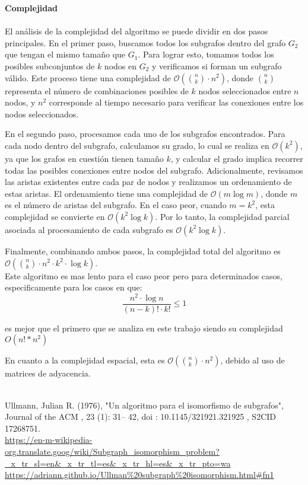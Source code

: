 \documentclass[12pt,a4paper]{article}
\begin{document}
\textbf{Complejidad}\\
\\
El análisis de la complejidad del algoritmo se puede dividir en dos pasos principales. En el primer paso, buscamos todos los subgrafos dentro del grafo \( G_2 \) que tengan el mismo tamaño que \( G_1 \). Para lograr esto, tomamos todos los posibles subconjuntos de \( k \) nodos en \( G_2 \) y verificamos si forman un subgrafo válido. Este proceso tiene una complejidad de \( \mathcal{O}\left(\binom{n}{k} \cdot n^2\right) \), donde \( \binom{n}{k} \) representa el número de combinaciones posibles de \( k \) nodos seleccionados entre \( n \) nodos, y \( n^2 \) corresponde al tiempo necesario para verificar las conexiones entre los nodos seleccionados.

En el segundo paso, procesamos cada uno de los subgrafos encontrados. Para cada nodo dentro del subgrafo, calculamos su grado, lo cual se realiza en \( \mathcal{O}(k^2) \), ya que los grafos en cuestión tienen tamaño \( k \), y calcular el grado implica recorrer todas las posibles conexiones entre nodos del subgrafo. Adicionalmente, revisamos las aristas existentes entre cada par de nodos y realizamos un ordenamiento de estas aristas. El ordenamiento tiene una complejidad de \( \mathcal{O}(m \log m) \), donde \( m \) es el número de aristas del subgrafo. En el caso peor, cuando \( m = k^2 \), esta complejidad se convierte en \( \mathcal{O}(k^2 \log k) \). Por lo tanto, la complejidad parcial asociada al procesamiento de cada subgrafo es \( \mathcal{O}(k^2 \log k) \).

Finalmente, combinando ambos pasos, la complejidad total del algoritmo es \( \mathcal{O}\left(\binom{n}{k} \cdot n^2 \cdot k^2 \cdot \log k\right) \).
\\
Este algoritmo es mas lento para el caso peor pero para determinados casos, especificamente para los casos en que:
\[
\frac{n^2 \cdot \log n}{(n-k)! \cdot k!} \leq 1
\]

es mejor que el primero que se analiza en este trabajo siendo su complejidad $O(n!*n^2)$


En cuanto a la complejidad espacial, esta es \( \mathcal{O}\left(\binom{n}{k} \cdot n^2\right) \), debido al uso de matrices de adyacencia.




\\
Ullmann, Julian R. (1976), "Un algoritmo para el isomorfismo de subgrafos", Journal of the ACM , 23 (1): 31– 42, doi : 10.1145/321921.321925 , S2CID  17268751.
\\
\url{https://en-m-wikipedia-org.translate.goog/wiki/Subgraph_isomorphism_problem?_x_tr_sl=en&_x_tr_tl=es&_x_tr_hl=es&_x_tr_pto=wa}
\\
\url {https://adriann.github.io/Ullman%20subgraph%20isomorphism.html#fn1}
\\
\end{document}

